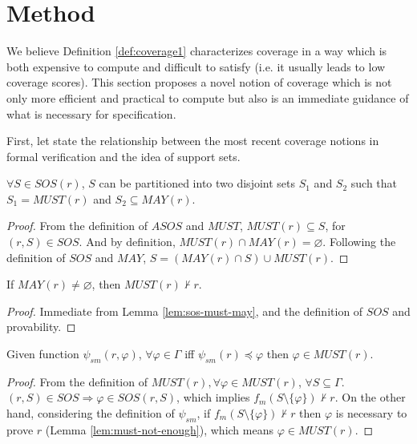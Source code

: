 \section{Method}
\label{sec:method}

We believe Definition \ref{def:coverage1} characterizes coverage in a way which is both expensive to compute and difficult to satisfy (i.e. it usually leads to low coverage scores). This section proposes a novel notion of coverage which is not only more efficient and practical to compute but also  is an immediate guidance of what is necessary for specification.

First, let state the relationship between the most recent coverage notions in formal verification and the idea of support sets.

\begin{lemma}
  \label{lem:sos-must-may}
 $\forall S \in SOS(r)$, $S$ can be partitioned into two disjoint sets $S_1$ and $S_2$
  such that $S_1 = MUST(r)$ and $S_2 \subseteq MAY(r)$.
\end{lemma}
\begin{proof}
 From the definition of $ASOS$ and $MUST$, $MUST(r) \subseteq S$, for $(r, S) \in SOS$. And
 by definition, $MUST(r) \cap MAY(r) = \varnothing$. Following the definition of $SOS$
 and $MAY$, $S = (MAY(r) \cap S) \cup MUST(r)$.
\end{proof}
\vspace{2mm}

\begin{lemma}
  \label{lem:must-not-enough}
  If $MAY(r) \neq \varnothing$, then $MUST(r) \nvdash r$.
\end{lemma}
\begin{proof}
 Immediate from Lemma \ref{lem:sos-must-may}, and the definition of $SOS$ and provability.
\end{proof}
\vspace{2mm}

\begin{lemma}
  \label{lem:must-coverage}
  Given function $\psi_{sm}(r, \varphi)$, $\forall \varphi \in \Gamma$ iff
  $\psi_{sm} (r) \preccurlyeq \varphi$ then  $\varphi \in MUST(r)$.

\end{lemma}
\begin{proof}
 From the definition of $MUST(r), \forall \varphi \in MUST (r)$, $\forall S \subseteq \Gamma$. $(r, S) \in SOS \Rightarrow \varphi \in SOS(r, S)$,
 which implies $f_m (S \setminus \{ \varphi \}) \nvdash r$.
 On the other hand, considering the definition of $\psi_{sm}$, if
 $f_m (S \setminus \{ \varphi \}) \nvdash r$ then $\varphi$ is necessary to prove $r$ (Lemma \ref{lem:must-not-enough}), which means $\varphi \in MUST(r)$.
\end{proof}
\vspace{2mm}

